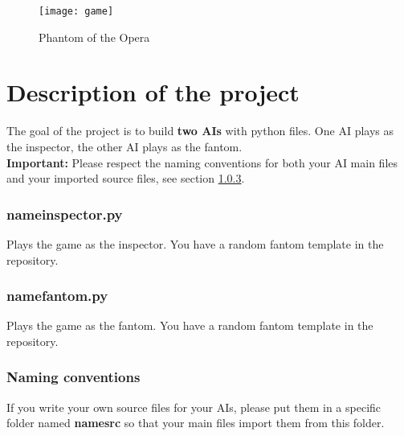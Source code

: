 \documentclass[
10pt, %
a4paper, %
oneside, %
headinclude,footinclude, %
BCOR5mm, %
]{scrartcl}
\title{\normalfont{Introduction to AI : project description}}
\author{\spacedlowsmallcaps{Nicolas Le Hir}
\\ {\color{Blue}nicolaslehir@gmail.com}
}
\date{}
\begin{document}
\renewcommand{\sectionmark}[1]{\markright{\spacedlowsmallcaps{#1}}}
\lehead{\mbox{\llap{\small\thepage\kern1em\color{halfgray} \vline}\color{halfgray}\hspace{0.5em}\rightmark\hfil}} 
\pagestyle{scrheadings}
\maketitle 
\setcounter{tocdepth}{3} 

\begin{figure}[htpb]
    \centering
    \texttt{[image: game]}
    \caption{Phantom of the Opera}
    \label{fig:game}
\end{figure}

\section{\large\color{Blue}Description of the project}

The goal of the project is to build \textbf{{two AIs}} with python files. One AI plays as the inspector, the other AI plays as the fantom.
\\

\textbf{{Important: }} Please respect the naming conventions for both your AI main files and your imported source files, see section \ref{sec:conventions}.

\subsubsection{\large\color{BlueViolet}name\textunderscore inspector.py}

Plays the game as the inspector. You have a random fantom template in the repository.

\subsubsection{\large\color{BlueViolet}name\textunderscore fantom.py}

Plays the game as the fantom. You have a random fantom template in the repository.

\subsubsection{\large\color{BlueViolet}Naming conventions}
\label{sec:conventions}

If you write your own source files for your AIs, please put them in a specific folder named \textbf{{name\textunderscore src}} so that your main files import them from this folder.
\end{document}
